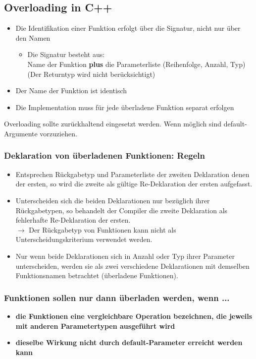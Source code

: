 \subsection{Overloading in C++}
\begin{itemize}
	\item Die Identifikation einer Funktion erfolgt über die Signatur, nicht nur über den Namen
	\begin{itemize}
		\item Die Signatur besteht aus:\\
			Name der Funktion \textbf{plus} die Parameterliste (Reihenfolge, Anzahl, Typ)\\
			(Der Returntyp wird nicht berücksichtigt)
	\end{itemize}
	\item Der Name der Funktion ist identisch
	\item Die Implementation muss für jede überladene Funktion separat erfolgen
\end{itemize}
\begin{hinweis}	 %
Overloading sollte zurückhaltend eingesetzt werden. Wenn möglich sind default-Argumente vorzuziehen.
\end{hinweis}

\subsubsection{Deklaration von überladenen Funktionen: Regeln}
\begin{itemize}
	\item Entsprechen Rückgabetyp und Parameterliste der zweiten Deklaration denen der ersten, so wird die zweite als gültige Re-Deklaration der ersten aufgefasst.
	\item Unterscheiden sich die beiden Deklarationen nur bezüglich ihrer Rückgabetypen, so behandelt der Compiler die zweite Deklaration als fehlerhafte Re-Deklaration der ersten.\\
	$\rightarrow$ Der Rückgabetyp von Funktionen kann nicht als Unterscheidungskriterium verwendet werden.
	\item Nur wenn beide Deklarationen sich in Anzahl oder Typ ihrer Parameter unterscheiden, werden sie als zwei verschiedene Deklarationen mit demselben Funktionsnamen betrachtet (überladene Funktionen).
\end{itemize}

\subsubsection{Funktionen sollen nur dann überladen werden, wenn ...}
\begin{itemize}
	\item \textbf{die Funktionen eine vergleichbare Operation bezeichnen, die jeweils mit anderen Parametertypen ausgeführt wird}
	\item \textbf{dieselbe Wirkung nicht durch default-Parameter erreicht werden kann}
\end{itemize}

